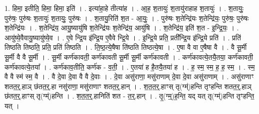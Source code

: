 \documentclass[17pt]{extarticle}
\begin{document}
1. हिमा॒ इतीति॒ हिमा॒ हिमा॒ इति॑ । . इत्या॑हा॒हे तीत्या॑ह । . आ॒ह॒ श॒तायुः॑ श॒तायु॑राहाह श॒तायुः॑ । . श॒तायुः॒ पुरु॑षः॒ पुरु॑षः श॒तायुः॑ श॒तायुः॒ पुरु॑षः । . श॒तायु॒रिति॑ श॒त - आ॒युः॒ । . पुरु॑षः श॒तेन्द्रि॑यः श॒तेन्द्रि॑यः॒ पुरु॑षः॒ पुरु॑षः श॒तेन्द्रि॑यः । . श॒तेन्द्रि॑य॒ आयु॒ष्यायु॑षि श॒तेन्द्रि॑यः श॒तेन्द्रि॑य॒ आयु॑षि । . श॒तेन्द्रि॑य॒ इति॑ श॒त - इ॒न्द्रि॒यः॒ । . आयु॑ष्ये॒वैवायु॒ष्यायु॑ष्ये॒व । . ए॒वे न्द्रि॒य इ॑न्द्रि॒य ए॒वैवे न्द्रि॒ये । . इ॒न्द्रि॒ये प्रति॒ प्रती᳚न्द्रि॒य इ॑न्द्रि॒ये प्रति॑ । . प्रति॑ तिष्ठति तिष्ठति॒ प्रति॒ प्रति॑ तिष्ठति । . ति॒ष्ठ॒त्ये॒षैषा ति॑ष्ठति तिष्ठत्ये॒षा । . ए॒षा वै वा ए॒षैषा वै । . वै सू॒र्मी सू॒र्मी वै वै सू॒र्मी । . सू॒र्मी कर्ण॑कावती॒ कर्ण॑कावती सू॒र्मी सू॒र्मी कर्ण॑कावती । . कर्ण॑कावत्ये॒तयै॒तया॒ कर्ण॑कावती॒ कर्ण॑कावत्ये॒तया᳚ । . कर्ण॑काव॒तीति॒ कर्ण॑क - व॒ती॒ । . ए॒तया॑ ह है॒तयै॒तया॑ ह । . ह॒ स्म॒ स्म॒ ह॒ ह॒ स्म॒ । . स्म॒ वै वै स्म॑ स्म॒ वै । . वै दे॒वा दे॒वा वै वै दे॒वाः । . दे॒वा असु॑राणा॒ मसु॑राणाम् दे॒वा दे॒वा असु॑राणाम् । . असु॑राणाꣳ शतत॒र्॒.हाञ् छ॑तत॒र्॒.हा नसु॑राणा॒ मसु॑राणाꣳ शतत॒र्॒.हान् । . श॒त॒त॒र्॒.हाꣳस् तृ(ग्म्॑)हन्ति तृꣳहन्ति शतत॒र्॒.हाञ् छ॑तत॒र्॒.हाꣳस् तृ(ग्म्॑)हन्ति । . श॒त॒त॒र्॒.हानिति॑ शत - त॒र्॒.हान् । . तृ॒(ग्म्॒)ह॒न्ति॒ यद् यत् तृ(ग्म्॑)हन्ति तृꣳहन्ति॒ यत् । \newline
\end{document}
